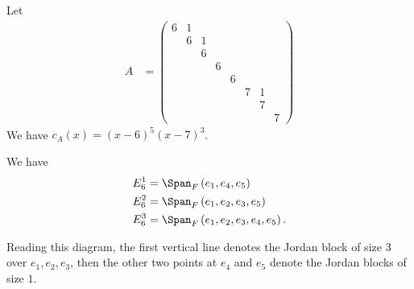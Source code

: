 \documentclass[10pt]{mypackage}
\begin{document}
\begin{example}
  Let
  \begin{align*}
    A &= \begin{pmatrix}
6 & 1 &  &  &  &  &  &  \\
 & 6 & 1 &  &  &  &  &  \\
 &  & 6 &  &  &  &  &  \\
 &  &  & 6 &  &  &  &  \\
 &  &  &  & 6 &  &  &  \\
 &  &  &  &  & 7 & 1 &  \\
 &  &  &  &  &  & 7 &  \\
 &  &  &  &  &  &  & 7 
\end{pmatrix} 
  \end{align*}
  We have $c_A(x) = \left(x-6\right)^5\left(x-7\right)^3$.\newline

  We have 
  \begin{align*}
    E_6^1 &= \Span_{F}\left(e_1,e_4,e_5\right)\\
    E_6^2 &= \Span_{F}\left(e_1,e_2,e_3,e_5\right)\\
    E_6^{3} &= \Span_{F}\left(e_1,e_2,e_3,e_4,e_5\right).
  \end{align*}
  \begin{center}
  \end{center}
  Reading this diagram, the first vertical line denotes the Jordan block of size $3$ over $e_1,e_2,e_3$, then the other two points at $e_4$ and $e_5$ denote the Jordan blocks of size $1$.
\end{example}
\end{document}
